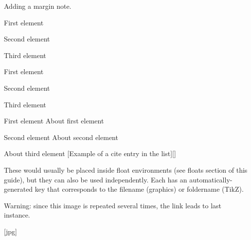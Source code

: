 Adding a margin note. 


\begin{myListEnumerate}
  \item First element
  \item Second element
  \item Third element
\end{myListEnumerate}
\begin{myListItemize}
  \item First element
  \item Second element
  \item Third element
\end{myListItemize}

\begin{myListMeta}
  \item[First element] About first element
  \item[Second element] About second element
  \item[\myListLabelStyle{Third element styled}] About third element
  [Example of a cite entry in the list][]%
\end{myListMeta}


These would usually be placed inside float environments (see floats section of this guide), but they can also be used independently.
Each has an automatically-generated key that corresponds to the filename (graphics) or foldername (TikZ).

\textcolor{myColorWarning}{Warning: since this image is repeated several times, the link leads to last instance.}


[jpg]%




